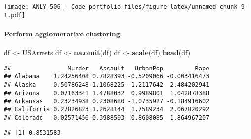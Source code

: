 \documentclass[]{article}
\newenvironment{Shaded}{\begin{snugshade}}{\end{snugshade}}
\newcommand{\KeywordTok}[1]{\textcolor[rgb]{0.13,0.29,0.53}{\textbf{#1}}}
\newcommand{\DataTypeTok}[1]{\textcolor[rgb]{0.13,0.29,0.53}{#1}}
\newcommand{\StringTok}[1]{\textcolor[rgb]{0.31,0.60,0.02}{#1}}
\newcommand{\ControlFlowTok}[1]{\textcolor[rgb]{0.13,0.29,0.53}{\textbf{#1}}}
\newcommand{\OperatorTok}[1]{\textcolor[rgb]{0.81,0.36,0.00}{\textbf{#1}}}
\newcommand{\NormalTok}[1]{#1}
\let\oldparagraph\paragraph
\renewcommand{\paragraph}[1]{\oldparagraph{#1}\mbox{}}
\begin{document}
\texttt{[image: ANLY\_506\_-\_Code\_portfolio\_files/figure-latex/unnamed-chunk-9-1.pdf]}

\paragraph{Perform agglomerative
clustering}\label{perform-agglomerative-clustering}

\begin{Shaded}
\begin{Highlighting}[]
\NormalTok{df <-}\StringTok{ }\NormalTok{USArrests}
\NormalTok{df <-}\StringTok{ }\KeywordTok{na.omit}\NormalTok{(df)}
\NormalTok{df <-}\StringTok{ }\KeywordTok{scale}\NormalTok{(df)}
\KeywordTok{head}\NormalTok{(df)}
\end{Highlighting}
\end{Shaded}

\begin{verbatim}
##                Murder   Assault   UrbanPop         Rape
## Alabama    1.24256408 0.7828393 -0.5209066 -0.003416473
## Alaska     0.50786248 1.1068225 -1.2117642  2.484202941
## Arizona    0.07163341 1.4788032  0.9989801  1.042878388
## Arkansas   0.23234938 0.2308680 -1.0735927 -0.184916602
## California 0.27826823 1.2628144  1.7589234  2.067820292
## Colorado   0.02571456 0.3988593  0.8608085  1.864967207
\end{verbatim}

\begin{Shaded}
\end{Shaded}

\begin{verbatim}
## [1] 0.8531583
\end{verbatim}

\begin{Shaded}
\end{Shaded}
\end{document}
